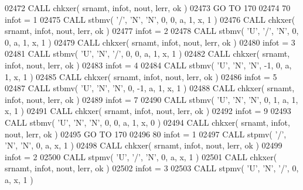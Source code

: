 \begin{DoxyCode}
02472       \textcolor{keyword}{CALL }chkxer( srnamt, infot, nout, lerr, ok )
02473       \textcolor{keywordflow}{GO TO} 170
02474    70 infot = 1
02475       \textcolor{keyword}{CALL }stbmv( \textcolor{stringliteral}{'/'}, \textcolor{stringliteral}{'N'}, \textcolor{stringliteral}{'N'}, 0, 0, a, 1, x, 1 )
02476       \textcolor{keyword}{CALL }chkxer( srnamt, infot, nout, lerr, ok )
02477       infot = 2
02478       \textcolor{keyword}{CALL }stbmv( \textcolor{stringliteral}{'U'}, \textcolor{stringliteral}{'/'}, \textcolor{stringliteral}{'N'}, 0, 0, a, 1, x, 1 )
02479       \textcolor{keyword}{CALL }chkxer( srnamt, infot, nout, lerr, ok )
02480       infot = 3
02481       \textcolor{keyword}{CALL }stbmv( \textcolor{stringliteral}{'U'}, \textcolor{stringliteral}{'N'}, \textcolor{stringliteral}{'/'}, 0, 0, a, 1, x, 1 )
02482       \textcolor{keyword}{CALL }chkxer( srnamt, infot, nout, lerr, ok )
02483       infot = 4
02484       \textcolor{keyword}{CALL }stbmv( \textcolor{stringliteral}{'U'}, \textcolor{stringliteral}{'N'}, \textcolor{stringliteral}{'N'}, -1, 0, a, 1, x, 1 )
02485       \textcolor{keyword}{CALL }chkxer( srnamt, infot, nout, lerr, ok )
02486       infot = 5
02487       \textcolor{keyword}{CALL }stbmv( \textcolor{stringliteral}{'U'}, \textcolor{stringliteral}{'N'}, \textcolor{stringliteral}{'N'}, 0, -1, a, 1, x, 1 )
02488       \textcolor{keyword}{CALL }chkxer( srnamt, infot, nout, lerr, ok )
02489       infot = 7
02490       \textcolor{keyword}{CALL }stbmv( \textcolor{stringliteral}{'U'}, \textcolor{stringliteral}{'N'}, \textcolor{stringliteral}{'N'}, 0, 1, a, 1, x, 1 )
02491       \textcolor{keyword}{CALL }chkxer( srnamt, infot, nout, lerr, ok )
02492       infot = 9
02493       \textcolor{keyword}{CALL }stbmv( \textcolor{stringliteral}{'U'}, \textcolor{stringliteral}{'N'}, \textcolor{stringliteral}{'N'}, 0, 0, a, 1, x, 0 )
02494       \textcolor{keyword}{CALL }chkxer( srnamt, infot, nout, lerr, ok )
02495       \textcolor{keywordflow}{GO TO} 170
02496    80 infot = 1
02497       \textcolor{keyword}{CALL }stpmv( \textcolor{stringliteral}{'/'}, \textcolor{stringliteral}{'N'}, \textcolor{stringliteral}{'N'}, 0, a, x, 1 )
02498       \textcolor{keyword}{CALL }chkxer( srnamt, infot, nout, lerr, ok )
02499       infot = 2
02500       \textcolor{keyword}{CALL }stpmv( \textcolor{stringliteral}{'U'}, \textcolor{stringliteral}{'/'}, \textcolor{stringliteral}{'N'}, 0, a, x, 1 )
02501       \textcolor{keyword}{CALL }chkxer( srnamt, infot, nout, lerr, ok )
02502       infot = 3
02503       \textcolor{keyword}{CALL }stpmv( \textcolor{stringliteral}{'U'}, \textcolor{stringliteral}{'N'}, \textcolor{stringliteral}{'/'}, 0, a, x, 1 )

\end{DoxyCode}
